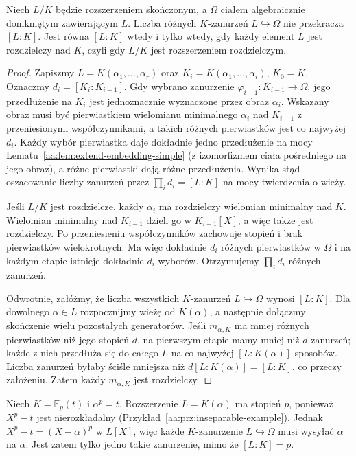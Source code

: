 \begin{twierdzenie}
\label{aa:tw:embeddings-count}
Niech $L/K$ będzie rozszerzeniem skończonym,
a $\Omega$ ciałem algebraicznie domkniętym zawierającym
$L$. Liczba różnych $K$-zanurzeń $L\hookrightarrow\Omega$
nie przekracza $[L:K]$. Jest równa $[L:K]$ wtedy
i tylko wtedy, gdy każdy element $L$ jest rozdzielczy
nad $K$, czyli gdy $L/K$ jest rozszerzeniem rozdzielczym.
\end{twierdzenie}
\begin{proof}
Zapiszmy $L=K(\alpha_1,\ldots,\alpha_r)$ oraz
$K_i=K(\alpha_1,\ldots,\alpha_i)$, $K_0=K$.
Oznaczmy $d_i=[K_i:K_{i-1}]$.
Gdy wybrano zanurzenie $\varphi_{i-1}:K_{i-1}\to\Omega$,
jego przedłużenie na $K_i$ jest jednoznacznie wyznaczone
przez obraz $\alpha_i$. Wskazany obraz musi być
pierwiastkiem wielomianu minimalnego $\alpha_i$
nad $K_{i-1}$ z przeniesionymi współczynnikami,
a takich różnych pierwiastków jest co najwyżej $d_i$.
Każdy wybór pierwiastka daje dokładnie jedno przedłużenie
na mocy Lematu~\ref{aa:lem:extend-embedding-simple}
(z izomorfizmem ciała pośredniego na jego obraz),
a różne pierwiastki dają różne przedłużenia.
Wynika stąd oszacowanie liczby zanurzeń przez
$\prod_i d_i=[L:K]$ na mocy twierdzenia o wieży.

Jeśli $L/K$ jest rozdzielcze, każdy $\alpha_i$ ma
rozdzielczy wielomian minimalny nad $K$. Wielomian
minimalny nad $K_{i-1}$ dzieli go w $K_{i-1}[X]$,
a więc także jest rozdzielczy. Po przeniesieniu
współczynników zachowuje stopień i brak pierwiastków
wielokrotnych. Ma więc dokładnie $d_i$ różnych
pierwiastków w $\Omega$ i na każdym etapie istnieje
dokładnie $d_i$ wyborów. Otrzymujemy $\prod_i d_i$
różnych zanurzeń.

Odwrotnie, załóżmy, że liczba wszystkich
$K$-zanurzeń $L\hookrightarrow\Omega$ wynosi $[L:K]$.
Dla dowolnego $\alpha\in L$ rozpocznijmy wieżę
od $K(\alpha)$, a następnie dołączmy skończenie
wielu pozostałych generatorów. Jeśli $m_{\alpha,K}$
ma mniej różnych pierwiastków niż jego stopień $d$,
na pierwszym etapie mamy mniej niż $d$ zanurzeń;
każde z nich przedłuża się do całego $L$ na co
najwyżej $[L:K(\alpha)]$ sposobów. Liczba
zanurzeń byłaby ściśle mniejsza niż
$d[L:K(\alpha)]=[L:K]$, co przeczy założeniu.
Zatem każdy $m_{\alpha,K}$ jest rozdzielczy.
\end{proof}

\begin{przyklad}
\label{aa:prz:inseparable-embeddings}
Niech $K=\mathbb F_p(t)$ i $\alpha^p=t$. Rozszerzenie
$L=K(\alpha)$ ma stopień $p$, ponieważ $X^p-t$
jest nierozkładalny (Przykład~\ref{aa:prz:inseparable-example}).
Jednak $X^p-t=(X-\alpha)^p$ w $L[X]$, więc
każde $K$-zanurzenie $L\hookrightarrow\Omega$ musi
wysyłać $\alpha$ na $\alpha$. Jest zatem tylko jedno
takie zanurzenie, mimo że $[L:K]=p$.
\end{przyklad}

